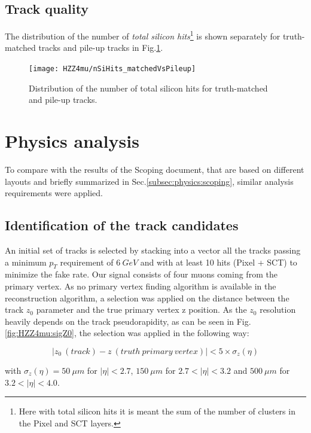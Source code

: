 \documentclass[a4paper,twoside,12pt]{book}
\begin{document}
\subsection*{Track quality}
The distribution of the number of \textit{total silicon hits}\footnote{Here with total silicon hits it is meant the sum of the number
of clusters in the Pixel and SCT layers.} is shown separately for truth-matched tracks and pile-up tracks in
Fig.\ref{fig:HZZ4mu:trackQuality}.

\begin{figure}
\centering
\texttt{[image: HZZ4mu/nSiHits\_matchedVsPileup]}
\caption{Distribution of the number of total silicon hits for truth-matched and pile-up tracks.}
\label{fig:HZZ4mu:trackQuality}
\end{figure}

\section{Physics analysis}\label{sec:physics:analysis}
To compare with the results of the Scoping document, that 
are based on different layouts and briefly summarized in Sec.\ref{subsec:physics:scoping}, 
similar analysis requirements were applied. \\

\subsection{Identification of the track candidates}
An initial set of tracks is selected by stacking into a vector all the tracks passing a minimum
$p_{T}$ requirement of $6\ GeV$ and with at least 10 hits (Pixel + SCT) to minimize the fake rate. 
Our signal consists
of four muons coming from the primary vertex. As no primary vertex finding algorithm
is available in the reconstruction algorithm, 
a selection was applied on the distance between the track $z_0$ parameter and the true primary vertex
z position. As the 
$z_0$ resolution heavily depends on the track pseudorapidity, as can be seen in Fig.
\ref{fig:HZZ4mu:sigZ0}, the selection was applied in the following way:

\begin{equation*}
|z_0\ (track) - z\ (truth\ primary\ vertex)| < 5 \times \sigma_{z} (\eta)
\end{equation*}

with $\sigma_{z} (\eta) = 50\ \mu m$ for $|\eta| < 2.7$, $150\ \mu m$ for $2.7 < |\eta| < 3.2$
and $500\ \mu m$ for $3.2 < |\eta| < 4.0$. 
\end{document}
